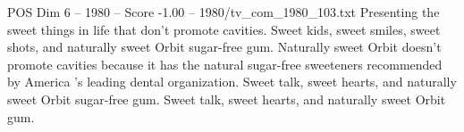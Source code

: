 \begin{textsample}{POS Dim 6 – 1980 – Score -1.00 – 1980/tv\_com\_1980\_103.txt}  \label{ex:f6_pos_059}
Presenting the sweet things in life that don't promote cavities.
Sweet kids, sweet smiles, sweet shots, and naturally sweet Orbit sugar-free gum.
Naturally sweet Orbit doesn't promote cavities because it has the natural sugar-free sweeteners recommended by America 's leading dental organization.
Sweet talk, sweet hearts, and naturally sweet Orbit sugar-free gum.
Sweet talk, sweet hearts, and naturally sweet Orbit gum.

\end{textsample}
